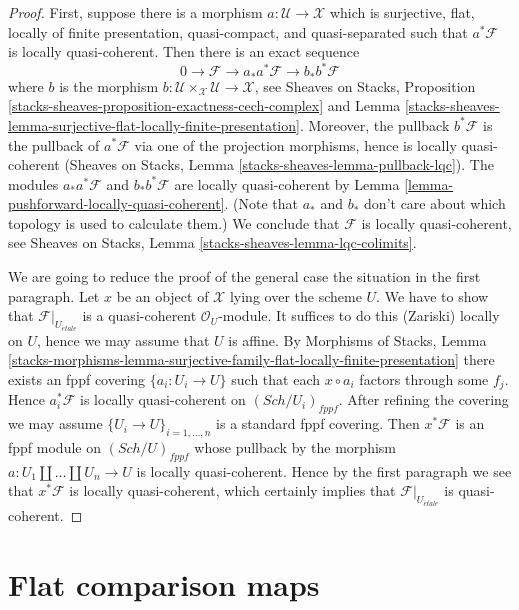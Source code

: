 \documentclass{stacks-project}
\theoremstyle{plain}
\theoremstyle{definition}
\theoremstyle{remark}
\numberwithin{equation}{subsection}
\def\Sch{\mathit{Sch}}
\def\etale{{\acute{e}tale}}
\begin{document}
\begin{proof}
First, suppose there is a morphism $a : \mathcal{U} \to \mathcal{X}$
which is surjective, flat, locally of finite presentation, quasi-compact,
and quasi-separated such that $a^*\mathcal{F}$ is locally quasi-coherent.
Then there is an exact sequence
$$
0 \to \mathcal{F} \to a_*a^*\mathcal{F} \to b_*b^*\mathcal{F}
$$
where $b$ is the morphism
$b : \mathcal{U} \times_\mathcal{X} \mathcal{U} \to \mathcal{X}$, see
Sheaves on Stacks, Proposition
\ref{stacks-sheaves-proposition-exactness-cech-complex} and
Lemma \ref{stacks-sheaves-lemma-surjective-flat-locally-finite-presentation}.
Moreover, the pullback $b^*\mathcal{F}$ is the pullback of $a^*\mathcal{F}$
via one of the projection morphisms, hence is locally quasi-coherent
(Sheaves on Stacks, Lemma \ref{stacks-sheaves-lemma-pullback-lqc}).
The modules $a_*a^*\mathcal{F}$ and $b_*b^*\mathcal{F}$ are locally
quasi-coherent by Lemma \ref{lemma-pushforward-locally-quasi-coherent}.
(Note that $a_*$ and $b_*$ don't care about which topology is
used to calculate them.)
We conclude that $\mathcal{F}$ is locally quasi-coherent, see
Sheaves on Stacks, Lemma \ref{stacks-sheaves-lemma-lqc-colimits}.

\medskip\noindent
We are going to reduce the proof of the general case the
situation in the first paragraph. Let $x$ be an object of $\mathcal{X}$
lying over the scheme $U$. We have to show that
$\mathcal{F}|_{U_\etale}$ is a quasi-coherent $\mathcal{O}_U$-module.
It suffices to do this (Zariski) locally on $U$, hence we may
assume that $U$ is affine. By
Morphisms of Stacks, Lemma
\ref{stacks-morphisms-lemma-surjective-family-flat-locally-finite-presentation}
there exists an fppf covering $\{a_i : U_i \to U\}$ such that
each $x \circ a_i$ factors through some $f_j$. Hence $a_i^*\mathcal{F}$
is locally quasi-coherent on $(\Sch/U_i)_{fppf}$. After refining
the covering we may assume $\{U_i \to U\}_{i = 1, \ldots, n}$
is a standard fppf covering. Then $x^*\mathcal{F}$ is an fppf
module on $(\Sch/U)_{fppf}$ whose pullback by the morphism
$a : U_1 \amalg \ldots \amalg U_n \to U$ is locally quasi-coherent.
Hence by the first paragraph we see that $x^*\mathcal{F}$ is locally
quasi-coherent, which certainly implies that $\mathcal{F}|_{U_\etale}$
is quasi-coherent.
\end{proof}






\section{Flat comparison maps}
\label{section-flat-comparison}
\end{document}
